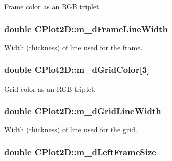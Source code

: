 Frame color as an R\-G\-B triplet. \hypertarget{class_c_plot2_d_a0c2de9464b391d1952b5f7d56a201338}{
\subsubsection[{m\-\_\-d\-Frame\-Line\-Width}]{\setlength{\rightskip}{0pt plus 5cm}double C\-Plot2\-D\-::m\-\_\-d\-Frame\-Line\-Width\hspace{0.3cm}{\ttfamily [protected]}}}\label{class_c_plot2_d_a0c2de9464b391d1952b5f7d56a201338}
Width (thickness) of line used for the frame. \hypertarget{class_c_plot2_d_a14309a0d60eab0fcb1a22dda976c9782}{
\subsubsection[{m\-\_\-d\-Grid\-Color}]{\setlength{\rightskip}{0pt plus 5cm}double C\-Plot2\-D\-::m\-\_\-d\-Grid\-Color\mbox{[}3\mbox{]}\hspace{0.3cm}{\ttfamily [protected]}}}\label{class_c_plot2_d_a14309a0d60eab0fcb1a22dda976c9782}
Grid color as an R\-G\-B triplet. \hypertarget{class_c_plot2_d_ab90840ed700bcc446c4754c31880f1c0}{
\subsubsection[{m\-\_\-d\-Grid\-Line\-Width}]{\setlength{\rightskip}{0pt plus 5cm}double C\-Plot2\-D\-::m\-\_\-d\-Grid\-Line\-Width\hspace{0.3cm}{\ttfamily [protected]}}}\label{class_c_plot2_d_ab90840ed700bcc446c4754c31880f1c0}
Width (thickness) of line used for the grid. \hypertarget{class_c_plot2_d_ad8e440649c61deff279fcd87f3cff18a}{
\subsubsection[{m\-\_\-d\-Left\-Frame\-Size}]{\setlength{\rightskip}{0pt plus 5cm}double C\-Plot2\-D\-::m\-\_\-d\-Left\-Frame\-Size\hspace{0.3cm}{\ttfamily [protected]}}}\label{class_c_plot2_d_ad8e440649c61deff279fcd87f3cff18a}
